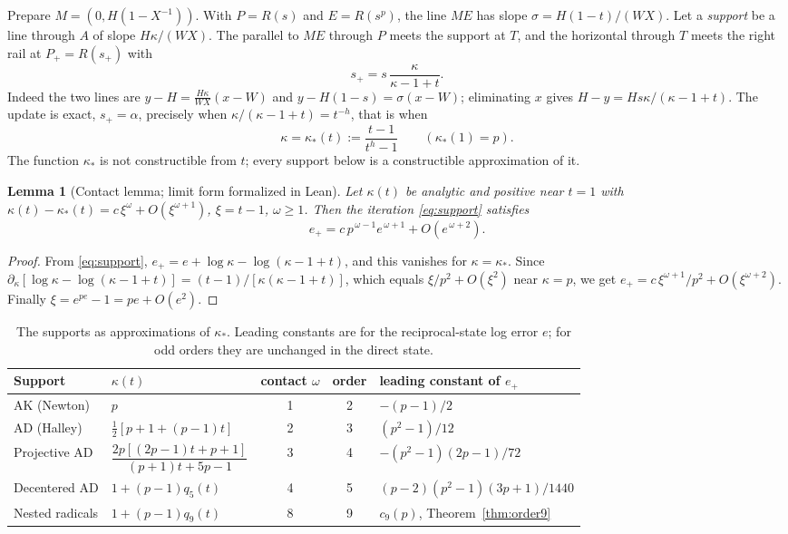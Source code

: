 \documentclass[10pt,a4paper]{article}
\theoremstyle{plain}
\newtheorem{lemma}[theorem]{Lemma}
\theoremstyle{remark}
\numberwithin{equation}{section}
\begin{document}
Prepare $M=(0,H(1-X^{-1}))$. With $P=R(s)$ and $E=R(s^{p})$, the line $ME$ has slope
$\sigma=H(1-t)/(WX)$. Let a \emph{support} be a line through $A$ of slope $H\kappa/(WX)$. The parallel
to $ME$ through $P$ meets the support at $T$, and the horizontal through $T$ meets the right rail at
$P_+=R(s_+)$ with
\begin{equation}\label{eq:support}
s_+=s\,\frac{\kappa}{\kappa-1+t}.
\end{equation}
Indeed the two lines are $y-H=\tfrac{H\kappa}{WX}(x-W)$ and $y-H(1-s)=\sigma(x-W)$; eliminating $x$
gives $H-y=Hs\kappa/(\kappa-1+t)$. The update is exact, $s_+=\alpha$, precisely when
$\kappa/(\kappa-1+t)=t^{-h}$, that is when
\begin{equation}\label{eq:kstar}
\kappa=\kappa_*(t):=\frac{t-1}{t^{h}-1}\qquad(\kappa_*(1)=p).
\end{equation}
The function $\kappa_*$ is not constructible from $t$; every support below is a constructible
approximation of it.

\begin{lemma}[Contact lemma; limit form formalized in Lean]\label{lem:contact}
Let $\kappa(t)$ be analytic and positive near $t=1$ with
$\kappa(t)-\kappa_*(t)=c\,\xi^{\omega}+O(\xi^{\omega+1})$, $\xi=t-1$, $\omega\ge1$. Then the iteration
\eqref{eq:support} satisfies
\[ e_+=c\,p^{\,\omega-1}e^{\,\omega+1}+O(e^{\,\omega+2}). \]
\end{lemma}
\begin{proof}
From \eqref{eq:support}, $e_+=e+\log\kappa-\log(\kappa-1+t)$, and this vanishes for
$\kappa=\kappa_*$. Since $\partial_\kappa[\log\kappa-\log(\kappa-1+t)]=(t-1)/[\kappa(\kappa-1+t)]$,
which equals $\xi/p^{2}+O(\xi^{2})$ near $\kappa=p$, we get
$e_+=c\,\xi^{\omega+1}/p^{2}+O(\xi^{\omega+2})$. Finally $\xi=e^{pe}-1=pe+O(e^{2})$.
\end{proof}

\begin{table}[h]
\centering\small
\caption{The supports as approximations of $\kappa_*$. Leading constants are for the reciprocal-state
log error $e$; for odd orders they are unchanged in the direct state.}\label{tab:supports}
\begin{tabular}{@{}llccl@{}}
\toprule
Support & $\kappa(t)$ & contact $\omega$ & order & leading constant of $e_+$\\
\midrule
AK (Newton) & $p$ & 1 & 2 & $-(p-1)/2$\\[2pt]
AD (Halley) & $\tfrac12[p+1+(p-1)t]$ & 2 & 3 & $(p^{2}-1)/12$\\[2pt]
Projective AD & $\dfrac{2p[(2p-1)t+p+1]}{(p+1)t+5p-1}$ & 3 & 4 & $-(p^{2}-1)(2p-1)/72$\\[6pt]
Decentered AD & $1+(p-1)q_5(t)$ & 4 & 5 & $(p-2)(p^{2}-1)(3p+1)/1440$\\[2pt]
Nested radicals & $1+(p-1)q_9(t)$ & 8 & 9 & $c_9(p)$, Theorem~\ref{thm:order9}\\
\bottomrule
\end{tabular}
\end{table}
\end{document}
